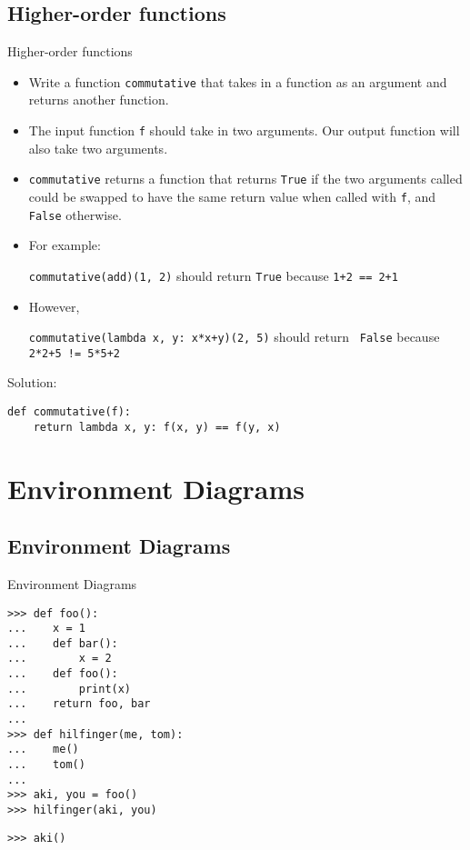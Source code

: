 \documentclass[9pt]{beamer}
\begin{document}
\subsection{Higher-order functions}
\begin{frame}[fragile]{Higher-order functions}
  \begin{itemize}
    \item
      Write a function {\tt commutative} that takes in a function as an
      argument and returns another function.

    \item
      The input function {\tt f} should take in two arguments. Our output function will also take two arguments.

    \item
      {\tt commutative} returns a function that returns {\tt True} if the
      two arguments called could be swapped to have the same return value
      when called with {\tt f}, and {\tt False} otherwise.

    \item
      For example:

      {\tt commutative(add)(1, 2)} should return {\tt True} because {\tt 1+2
      == 2+1}
    \item
      However,

      {\tt commutative(lambda x, y: x*x+y)(2, 5)} should return {\tt
      False} because {\tt 2*2+5 != 5*5+2}
  \end{itemize}

  \pause
  Solution:
  \begin{lstlisting}
def commutative(f):
    return lambda x, y: f(x, y) == f(y, x)
  \end{lstlisting}
\end{frame}

\section{Environment Diagrams}
\subsection{Environment Diagrams}
\begin{frame}[fragile]{Environment Diagrams}
  \begin{lstlisting}[numbers=none, frame=none, xleftmargin=0pt]
>>> def foo():
...    x = 1
...    def bar():
...        x = 2
...    def foo():
...        print(x)
...    return foo, bar
...
>>> def hilfinger(me, tom):
...    me()
...    tom()
...
>>> aki, you = foo()
>>> hilfinger(aki, you)
  \end{lstlisting}
  \begin{lstlisting}[numbers=none, frame=none, xleftmargin=0pt]
>>> aki()
  \end{lstlisting}
\end{frame}
\end{document}

